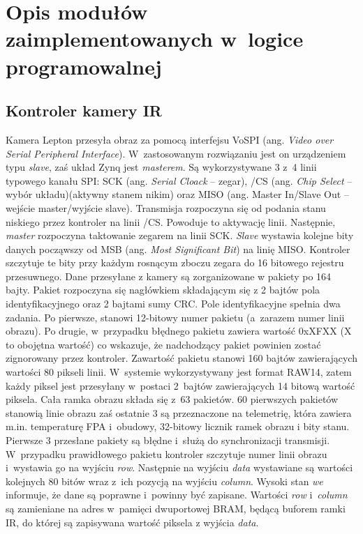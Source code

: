 \section{Opis modułów zaimplementowanych w~logice programowalnej}

\subsection{Kontroler kamery IR}
Kamera Lepton przesyła obraz za pomocą interfejsu VoSPI (ang. \textit{Video over Serial Peripheral Interface}). 
W~zastosowanym rozwiązaniu jest on urządzeniem typu \textit{slave}, zaś układ Zynq jest \textit{masterem}. 
Są wykorzystywane 3 z~4 linii typowego kanału SPI: SCK (ang. \textit{Serial Cloack} -- zegar), /CS (ang. \textit{Chip Select} -- wybór układu)(aktywny stanem nikim) oraz MISO (ang. {Master In/Slave Out} – wejście master/wyjście slave).
Transmisja rozpoczyna się od podania stanu niskiego przez kontroler na linii /CS. 
Powoduje to aktywację linii. 
Następnie, \textit{master} rozpoczyna taktowanie zegarem na linii SCK. \textit{Slave} wystawia kolejne bity danych począwszy od MSB (ang. \textit{Most Significant Bit}) na linię MISO. 
Kontroler szczytuje te bity przy każdym rosnącym zboczu zegara do 16 bitowego rejestru przesuwnego.
Dane przesyłane z kamery są zorganizowane w pakiety po 164 bajty. Pakiet rozpoczyna się nagłówkiem składającym się z 2 bajtów pola identyfikacyjnego oraz 2 bajtami sumy CRC. 
Pole identyfikacyjne spełnia dwa zadania. 
Po pierwsze, stanowi 12-bitowy numer pakietu (a~zarazem numer linii obrazu). 
Po drugie, w~przypadku błędnego pakietu zawiera wartość 0xXFXX (X to obojętna wartość) co wskazuje, że nadchodzący pakiet powinien zostać zignorowany przez kontroler. 
Zawartość pakietu stanowi 160 bajtów zawierających wartości 80 pikseli linii. 
W~systemie wykorzystywany jest format RAW14, zatem każdy piksel jest przesyłany w~postaci 2~bajtów zawierających 14 bitową wartość piksela.
Cała ramka obrazu składa się z~63 pakietów. 
60 pierwszych pakietów stanowią linie obrazu zaś ostatnie 3 są przeznaczone na telemetrię, która zawiera m.in. temperaturę FPA i~obudowy, 32-bitowy licznik ramek obrazu i bity stanu. %
Pierwsze 3 przesłane pakiety są błędne i~służą do synchronizacji transmisji.
W~przypadku prawidłowego pakietu kontroler szczytuje numer linii obrazu i~wystawia go na wyjściu \textit{row}. 
Następnie na wyjściu \textit{data} wystawiane są wartości kolejnych 80 bitów wraz z~ich pozycją na wyjściu \textit{column}. 
Wysoki stan \textit{we} informuje, że dane są poprawne i~powinny być zapisane.
Wartości \textit{row} i~\textit{column} są zamieniane na adres w~pamięci dwuportowej BRAM, będącą buforem ramki IR, do której są zapisywana wartość piksela z wyjścia \textit{data}. %

